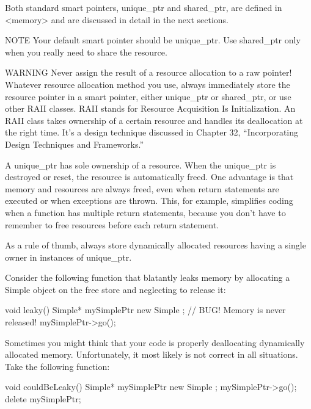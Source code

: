 Both standard smart pointers, unique\_ptr and shared\_ptr, are defined in <memory> and are discussed in detail in the next sections.

\begin{myNotic}{NOTE}
Your default smart pointer should be unique\_ptr. Use shared\_ptr only when you really need to share the resource.
\end{myNotic}

\begin{myWarning}{WARNING}
Never assign the result of a resource allocation to a raw pointer! Whatever resource allocation method you use, always immediately store the resource pointer in a smart pointer, either unique\_ptr or shared\_ptr, or use other RAII classes. RAII stands for Resource Acquisition Is Initialization. An RAII class takes ownership of a certain resource and handles its deallocation at the right time. It’s a design technique discussed in Chapter 32, “Incorporating Design Techniques and Frameworks.”
\end{myWarning}


A unique\_ptr has sole ownership of a resource. When the unique\_ptr is destroyed or reset, the resource is automatically freed. One advantage is that memory and resources are always freed, even when return statements are executed or when exceptions are thrown. This, for example, simplifies coding when a function has multiple return statements, because you don’t have to remember to free resources before each return statement.

As a rule of thumb, always store dynamically allocated resources having a single owner in instances of unique\_ptr.


Consider the following function that blatantly leaks memory by allocating a Simple object on the free store and neglecting to release it:

\begin{cpp}
void leaky()
{
    Simple* mySimplePtr { new Simple{} }; // BUG! Memory is never released!
    mySimplePtr->go();
}
\end{cpp}

Sometimes you might think that your code is properly deallocating dynamically allocated memory. Unfortunately, it most likely is not correct in all situations. Take the following function:

\begin{cpp}
void couldBeLeaky()
{
    Simple* mySimplePtr { new Simple{} };
    mySimplePtr->go();
    delete mySimplePtr;
}
\end{cpp}

